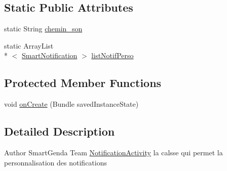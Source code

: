 \subsection*{Static Public Attributes}
\begin{DoxyCompactItemize}
\item 
static String \hyperlink{classcom_1_1agenda_1_1ter_1_1smartgenda_1_1_notification_activity_ae6a52fd850ecd253b963340e2fa03912}{chemin\-\_\-son}
\item 
static Array\-List\\*
$<$ \hyperlink{classcom_1_1agenda_1_1ter_1_1model_1_1_smart_notification}{Smart\-Notification} $>$ \hyperlink{classcom_1_1agenda_1_1ter_1_1smartgenda_1_1_notification_activity_af02388bb3c735063760d16584d84765f}{list\-Notif\-Perso}
\end{DoxyCompactItemize}
\subsection*{Protected Member Functions}
\begin{DoxyCompactItemize}
\item 
void \hyperlink{classcom_1_1agenda_1_1ter_1_1smartgenda_1_1_notification_activity_ae67fe9fc383ba7810eda828c50b3aae5}{on\-Create} (Bundle saved\-Instance\-State)
\end{DoxyCompactItemize}


\subsection{Detailed Description}
\begin{DoxyAuthor}{Author}
Smart\-Genda Team \hyperlink{classcom_1_1agenda_1_1ter_1_1smartgenda_1_1_notification_activity}{Notification\-Activity} la calsse qui permet la personnalisation des notifications 
\end{DoxyAuthor}


